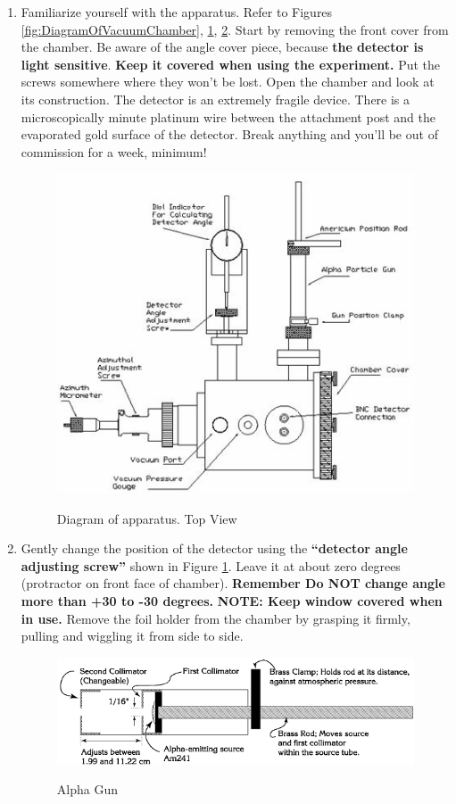 \documentclass{../lab}
\begin{document}
\begin{enumerate}
    \item Familiarize yourself with the apparatus. Refer to Figures \ref{fig:DiagramOfVacuumChamber}, \ref{fig:DiagramOfApparatusTopView}, \ref{fig:AlphaGun}. Start by removing the front cover from the chamber. Be aware of the angle cover piece, because \textbf{the detector is light sensitive}. \textbf{Keep it covered when using the experiment.} Put the screws somewhere where they won't be lost. Open the chamber and look at its construction. The detector is an extremely fragile device. There is a microscopically minute platinum wire between the attachment post and the evaporated gold surface of the detector. Break anything and you'll be out of commission for a week, minimum!
   
    \begin{figure}[h]
        \centering
        \href{http://experimentationlab.berkeley.edu/sites/default/files/images/RUT13.jpg}{\includegraphics[width=0.5\linewidth]{images/RUT13.jpg}}
        \caption{Diagram of apparatus. Top View}
        \label{fig:DiagramOfApparatusTopView}
    \end{figure}

    \item Gently change the position of the detector using the \textbf{``detector angle adjusting screw''} shown in Figure \ref{fig:DiagramOfApparatusTopView}. Leave it at about zero degrees (protractor on front face of chamber). \textbf{Remember Do NOT change angle more than +30 to -30 degrees.} \textbf{NOTE: Keep window covered when in use.} Remove the foil holder from the chamber by grasping it firmly, pulling and wiggling it from side to side.

    \begin{figure}[h]
        \centering
        \href{http://experimentationlab.berkeley.edu/sites/default/files/images/RUT14.gif}{\includegraphics[width=0.5\linewidth]{images/RUT14.png}}
        \caption{Alpha Gun}
        \label{fig:AlphaGun}
    \end{figure}


\end{enumerate}
\end{document}
